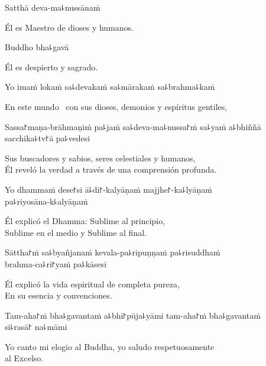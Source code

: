 Satthā deva-ma꜕nussānaṁ

\begin{english}
  Él es Maestro de dioses y humanos.
\end{english}

Buddho bha꜕gavā

\begin{english}
  Él es despierto y sagrado.
\end{english}

Yo imaṁ lokaṁ sa꜕devakaṁ sa꜕mārakaṁ sa꜕brahma꜕kaṁ

\begin{english}
  En este mundo \pause\ con sus dioses, demonios y espíritus gentiles,
\end{english}

Sassa꜓maṇa-brāhmaṇiṁ pa꜕jaṁ sa꜕deva-ma꜕nussa꜓ṁ sa꜕yaṁ a꜕bhiññā sacchika꜕tv꜓ā pa꜕vedesi

\begin{english}
  Sus buscadores y sabios, seres celestiales y humanos,\\ Él reveló la verdad a través de una comprensión profunda.
\end{english}

Yo dhammaṁ dese꜓si ā꜕di꜓-kalyāṇaṁ majjhe꜓-ka꜕lyāṇaṁ \\pa꜕riyosāna-k꜕alyāṇaṁ

\begin{english}
  Él explicó el Dhamma: Sublime al principio,\\ Sublime en el medio y Sublime al final.
\end{english}

Sāttha꜓ṁ sa꜕byañjanaṁ kevala-pa꜕ripuṇṇaṁ pa꜕risuddhaṁ \\brahma-ca꜕ri꜓yaṁ pa꜕kāsesi

\begin{english}
  Él explicó la vida espiritual de completa pureza,\\En su esencia y convenciones.
\end{english}

Tam-aha꜓ṁ bha꜕gavantaṁ a꜕bhi꜓pūja꜕yāmi tam-aha꜓ṁ bha꜕gavantaṁ \\si꜕rasā꜓ na꜕māmi

\begin{english}
  Yo canto mi elogio al Buddha, yo saludo respetuosamente \\al Excelso.
\end{english}

\clearpage


